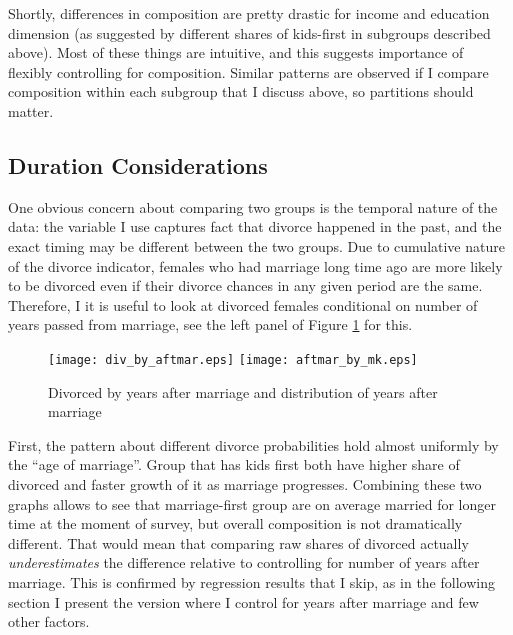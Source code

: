 \documentclass[12pt,letter]{article}
\begin{document}
Shortly, differences in composition are pretty drastic for income and education dimension (as suggested by different shares of kids-first in subgroups described above). Most of these things are intuitive, and this suggests importance of flexibly controlling for composition. Similar patterns are observed if I compare composition within each subgroup that I discuss above, so partitions should matter. 


\subsection{Duration Considerations}
One obvious concern about comparing two groups is the temporal nature of the data: the variable I use captures fact that divorce happened in the past, and the exact timing may be different between the two groups. Due to cumulative nature of the divorce indicator, females who had marriage long time ago are more likely to be divorced even if their divorce chances in any given period are the same. Therefore, I it is useful to look at divorced females conditional on number of years passed from marriage, see the left panel of Figure \ref{pic-aftmar} for this.
\begin{figure}[h!]
\texttt{[image: div\_by\_aftmar.eps]}
\texttt{[image: aftmar\_by\_mk.eps]}
\caption{Divorced by years after marriage and distribution of years after marriage\label{pic-aftmar}}
\end{figure}

First, the pattern about different divorce probabilities hold almost uniformly by the ``age of marriage''. Group that has kids first both have higher share of divorced and faster growth of it as marriage progresses. Combining these two graphs allows to see that marriage-first group are on average married for longer time at the moment of survey, but overall composition is not dramatically different. That would mean that comparing raw shares of divorced actually \emph{underestimates} the difference relative to controlling for number of years after marriage. This is confirmed by regression results that I skip, as in the following section I present the version where I control for years after marriage and few other factors.
\end{document}
